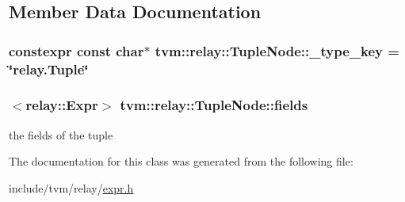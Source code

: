 \subsection{Member Data Documentation}
\subsubsection[{\texorpdfstring{\+\_\+type\+\_\+key}{_type_key}}]{\setlength{\rightskip}{0pt plus 5cm}constexpr const char$\ast$ tvm\+::relay\+::\+Tuple\+Node\+::\+\_\+type\+\_\+key = \char`\"{}relay.\+Tuple\char`\"{}\hspace{0.3cm}{\ttfamily [static]}}\hypertarget{classtvm_1_1relay_1_1TupleNode_aa01467badaa2110d0b87b3243c99b568}{}\label{classtvm_1_1relay_1_1TupleNode_aa01467badaa2110d0b87b3243c99b568}
\subsubsection[{\texorpdfstring{fields}{fields}}]{$<${\bf relay\+::\+Expr}$>$ tvm\+::relay\+::\+Tuple\+Node\+::fields}\hypertarget{classtvm_1_1relay_1_1TupleNode_a97f7a213817d69edaa782dbefa1e8458}{}\label{classtvm_1_1relay_1_1TupleNode_a97f7a213817d69edaa782dbefa1e8458}


the fields of the tuple 



The documentation for this class was generated from the following file\+:\begin{DoxyCompactItemize}
\item 
include/tvm/relay/\hyperlink{relay_2expr_8h}{expr.\+h}\end{DoxyCompactItemize}
